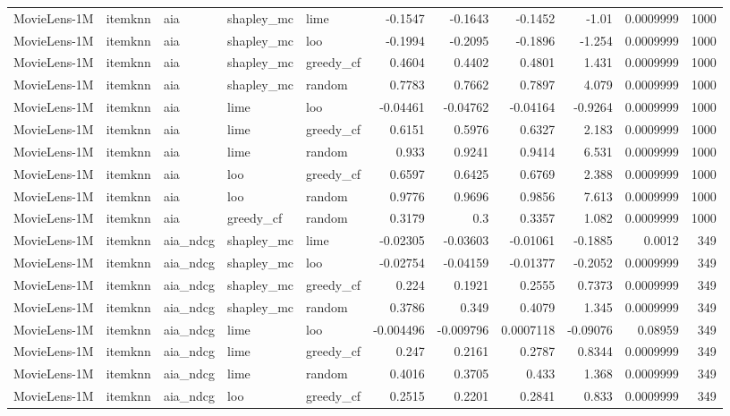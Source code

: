 \begin{table}[t]
\begin{tabular}{lllllrrrrrr}
MovieLens-1M & itemknn & aia & shapley\_mc & lime & -0.1547 & -0.1643 & -0.1452 & -1.01 & 0.0009999 & 1000 \\
MovieLens-1M & itemknn & aia & shapley\_mc & loo & -0.1994 & -0.2095 & -0.1896 & -1.254 & 0.0009999 & 1000 \\
MovieLens-1M & itemknn & aia & shapley\_mc & greedy\_cf & 0.4604 & 0.4402 & 0.4801 & 1.431 & 0.0009999 & 1000 \\
MovieLens-1M & itemknn & aia & shapley\_mc & random & 0.7783 & 0.7662 & 0.7897 & 4.079 & 0.0009999 & 1000 \\
MovieLens-1M & itemknn & aia & lime & loo & -0.04461 & -0.04762 & -0.04164 & -0.9264 & 0.0009999 & 1000 \\
MovieLens-1M & itemknn & aia & lime & greedy\_cf & 0.6151 & 0.5976 & 0.6327 & 2.183 & 0.0009999 & 1000 \\
MovieLens-1M & itemknn & aia & lime & random & 0.933 & 0.9241 & 0.9414 & 6.531 & 0.0009999 & 1000 \\
MovieLens-1M & itemknn & aia & loo & greedy\_cf & 0.6597 & 0.6425 & 0.6769 & 2.388 & 0.0009999 & 1000 \\
MovieLens-1M & itemknn & aia & loo & random & 0.9776 & 0.9696 & 0.9856 & 7.613 & 0.0009999 & 1000 \\
MovieLens-1M & itemknn & aia & greedy\_cf & random & 0.3179 & 0.3 & 0.3357 & 1.082 & 0.0009999 & 1000 \\
MovieLens-1M & itemknn & aia\_ndcg & shapley\_mc & lime & -0.02305 & -0.03603 & -0.01061 & -0.1885 & 0.0012 & 349 \\
MovieLens-1M & itemknn & aia\_ndcg & shapley\_mc & loo & -0.02754 & -0.04159 & -0.01377 & -0.2052 & 0.0009999 & 349 \\
MovieLens-1M & itemknn & aia\_ndcg & shapley\_mc & greedy\_cf & 0.224 & 0.1921 & 0.2555 & 0.7373 & 0.0009999 & 349 \\
MovieLens-1M & itemknn & aia\_ndcg & shapley\_mc & random & 0.3786 & 0.349 & 0.4079 & 1.345 & 0.0009999 & 349 \\
MovieLens-1M & itemknn & aia\_ndcg & lime & loo & -0.004496 & -0.009796 & 0.0007118 & -0.09076 & 0.08959 & 349 \\
MovieLens-1M & itemknn & aia\_ndcg & lime & greedy\_cf & 0.247 & 0.2161 & 0.2787 & 0.8344 & 0.0009999 & 349 \\
MovieLens-1M & itemknn & aia\_ndcg & lime & random & 0.4016 & 0.3705 & 0.433 & 1.368 & 0.0009999 & 349 \\
MovieLens-1M & itemknn & aia\_ndcg & loo & greedy\_cf & 0.2515 & 0.2201 & 0.2841 & 0.833 & 0.0009999 & 349 \\

\end{tabular}
\end{table}
